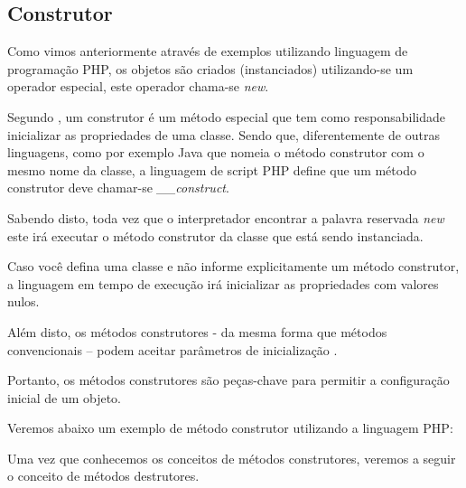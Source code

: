 \subsection{Construtor}

Como vimos anteriormente através de exemplos utilizando linguagem de
programação PHP, os objetos são criados (instanciados) utilizando-se um
operador especial, este operador chama-se \textit{new}.

Segundo , um construtor é um método especial que tem
como responsabilidade inicializar as propriedades de uma classe. Sendo que,
diferentemente de outras linguagens, como por exemplo Java que nomeia o  método
construtor com o mesmo nome da classe, a linguagem de script PHP define  que um
método construtor deve chamar-se \textit{\_\_construct}.

Sabendo disto, toda vez que o interpretador encontrar a palavra reservada
\textit{new} este irá executar o método construtor da classe que está sendo
instanciada.

Caso você defina uma classe e não informe explicitamente um método construtor, a
linguagem em tempo de execução irá inicializar as propriedades com valores nulos.

Além disto, os métodos construtores - da mesma forma que métodos convencionais –
podem aceitar parâmetros de inicialização \cite{learningJava}.

Portanto, os métodos construtores são peças-chave para permitir a configuração
inicial de um objeto.

Veremos abaixo um exemplo de método construtor utilizando a linguagem PHP:

Uma vez que conhecemos os conceitos de métodos construtores, veremos a seguir  o
conceito de métodos destrutores.